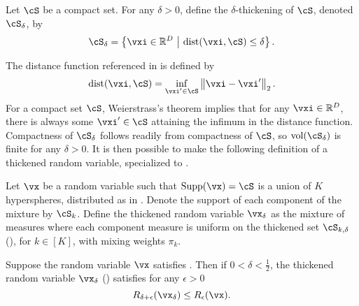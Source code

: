 \documentclass[../../book-main.tex]{subfiles}
\begin{document}
\begin{definition}\label{def:thickening-set}
    Let $\cS$ be a compact set.
    For any $\delta > 0$, define the $\delta$-thickening of $\cS$, denoted
    $\cS_{\delta}$, by
    \begin{equation}
        \cS_{\delta} = \set*{\vxi \in \R^D \given \mathrm{dist}(\vxi, \cS) \leq
        \delta}.
    \end{equation}
\end{definition}
The distance function referenced in  is defined by
\begin{equation}\label{eq:dist-func}
    \dist(\vxi, \cS) = \inf_{\vxi' \in \cS} \norm*{\vxi - \vxi'}_2.
\end{equation}
For a compact set $\cS$, Weierstrass's theorem implies that for any $\vxi \in
\R^D$, there is always some $\vxi' \in \cS$ attaining the infimum in the distance
function. 
Compactness of $\cS_{\delta}$ follows readily from compactness of $\cS$, so
$\volume(\cS_{\delta})$ is finite for any $\delta > 0$. It is then possible to
make the following definition of a thickened random variable, specialized to
.


\begin{definition}\label{def:thickening-rv-uos}
    Let $\vx$ be a random variable such that $\Supp(\vx) = \cS$ is a union of
    $K$ hyperspheres, distributed as in .
    Denote the support of each component of the mixture by $\cS_k$.
    Define the thickened random variable $\vx_{\delta}$ as the mixture of
    measures where each component measure is uniform on the thickened set
    $\cS_{k, \delta}$ (), for $k \in [K]$, with mixing
    weights $\pi_k$.
\end{definition}


\begin{lemma}\label{lem:rate-distortion-lb-uos}
    Suppose the random variable $\vx$ satisfies
    . Then if $0 < \delta < \tfrac{1}{2}$, the
    thickened random variable $\vx_{\delta}$ ()
    satisfies for any $\epsilon > 0$
    \begin{equation}
        R_{\delta + \epsilon}(\vx_{\delta})
        \leq
        R_{\epsilon}(\vx).
    \end{equation}
\end{lemma}
\end{document}
